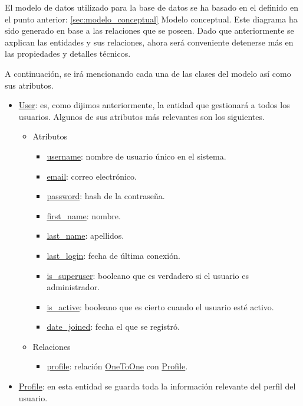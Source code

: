 El modelo de datos utilizado para la base de datos se ha basado en el definido en el punto anterior: \ref{sec:modelo_conceptual} Modelo conceptual. Este diagrama ha sido generado en base a las relaciones que se poseen. Dado que anteriormente se axplican las entidades y sus relaciones, ahora será conveniente detenerse más en las propiedades y detalles técnicos.


A continuación, se irá mencionando cada una de las clases del modelo así como sus atributos.

\begin{itemize}
    \item \underline{User}: es, como dijimos anteriormente, la entidad que gestionará a todos los usuarios. Algunos de sus atributos más relevantes son los siguientes.
    \begin{itemize}
        \item Atributos
        \begin{itemize}
            \item \underline{username}: nombre de usuario único en el sistema.
            \item \underline{email}: correo electrónico.
            \item \underline{password}: hash de la contraseña.
            \item \underline{first\_name}: nombre.
            \item \underline{last\_name}: apellidos.
            \item \underline{last\_login}: fecha de última conexión.
            \item \underline{is\_superuser}: booleano que es verdadero si el usuario es administrador.
            \item \underline{is\_active}: booleano que es cierto cuando el usuario esté activo.
            \item \underline{date\_joined}: fecha el que se registró.
        \end{itemize}
        \item Relaciones
        \begin{itemize}
            \item \underline{profile}: relación \underline{OneToOne} con \underline{Profile}.
        \end{itemize}
    \end{itemize}
    \item \underline{Profile}: en esta entidad se guarda toda la información relevante del perfil del usuario.

\end{itemize}
